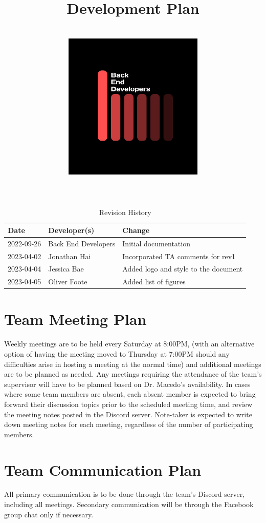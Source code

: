 \documentclass[12pt]{article}
\title{\textbf{Development Plan\\\progname \\ \vspace{2cm} \includegraphics[width=0.5\textwidth]{../logo.jpg}}}
\author{\authname}
\date{}
\begin{document}
\color{white}\maketitle
\color{black}
\newpage

\tableofcontents
\listoftables
\listoffigures

\newpage

\begin{table}[hp]
\caption{Revision History} \label{TblRevisionHistory}
\begin{tabularx}{\textwidth}{llX}
\toprule
\textbf{Date} & \textbf{Developer(s)} & \textbf{Change}\\
\midrule
2022-09-26 & Back End Developers & Initial documentation\\
2023-04-02 & Jonathan Hai & Incorporated TA comments for rev1\\
2023-04-04 & Jessica Bae & Added logo and style to the document\\
2023-04-05 & Oliver Foote & Added list of figures\\
\bottomrule
\end{tabularx}
\end{table}

\pagebreak

\section{Team Meeting Plan}
Weekly meetings are to be held every Saturday at 8:00PM, (with an alternative option of having the meeting moved to Thursday at 7:00PM should any difficulties arise in hosting a meeting at the normal time) and additional meetings are to be planned as needed. Any meetings requiring the attendance of the team's supervisor will have to be planned based on Dr. Macedo's availability. In cases where some team members are absent, each absent member is expected to bring forward their discussion topics prior to the scheduled meeting time, and review the meeting notes posted in the Discord server. Note-taker is expected to write down meeting notes for each meeting, regardless of the number of participating members.\\

\pagebreak

\section{Team Communication Plan}
All primary communication is to be done through the team's Discord server, including all meetings. Secondary communication will be through the Facebook group chat only if necessary.\\
\end{document}
